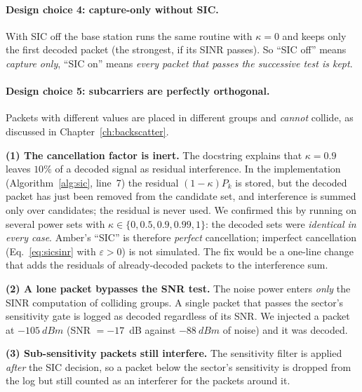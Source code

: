 \paragraph{Design choice 4: capture-only without SIC.}
With SIC off the base station runs the same routine with $\kappa=0$ and keeps only the first decoded packet (the strongest, if its SINR
passes). So ``SIC off'' means \emph{capture only}, ``SIC on'' means \emph{every packet that passes the successive test is kept}.

\paragraph{Design choice 5: subcarriers are perfectly orthogonal.}
Packets with different  values are placed in different groups and \emph{cannot} collide, as discussed in Chapter~\ref{ch:backscatter}.

\begin{reality}
\textbf{(1) The cancellation factor is inert.} The  docstring explains that $\kappa=0.9$ leaves $10\%$ of a decoded signal as residual interference. In the
implementation (Algorithm~\ref{alg:sic}, line~7) the residual $(1-\kappa)P_k$ is stored, but the decoded packet has just been removed from the candidate set, and interference is summed
only over candidates; the residual is never used. We confirmed this by running  on several power sets with $\kappa\in\{0,0.5,0.9,0.99,1\}$: the decoded sets were \emph{identical in every case}. Amber's ``SIC'' is therefore
\emph{perfect} cancellation; imperfect cancellation (Eq.~\eqref{eq:sicsinr} with $\varepsilon>0$) is not simulated. The fix would be a one-line change
that adds the residuals of already-decoded packets to the interference sum.

\textbf{(2) A lone packet bypasses the SNR test.} The noise power enters \emph{only} the SINR computation of colliding groups. A single packet that passes the sector's sensitivity gate is logged as decoded regardless of its SNR. We injected a packet at $\SI{-105}{dBm}$
(SNR $=-17$~dB against $\SI{-88}{dBm}$ of noise) and it was decoded.

\textbf{(3) Sub-sensitivity packets still interfere.} The sensitivity filter is applied \emph{after} the SIC decision, so a packet below the sector's sensitivity is dropped from the log but still counted as an interferer for the packets around it.
\end{reality}

